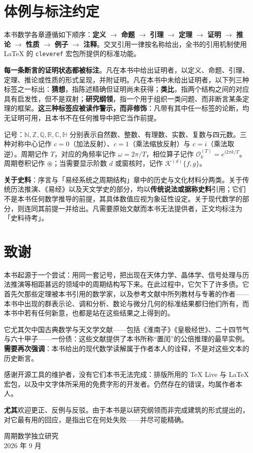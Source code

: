 \section*{体例与标注约定}

本书数学各章遵循如下顺序：\textbf{定义} $\to$ \textbf{命题} $\to$ \textbf{引理} $\to$ \textbf{定理} $\to$ \textbf{证明} $\to$ \textbf{推论} $\to$ \textbf{性质} $\to$ \textbf{例子} $\to$ \textbf{注释}。交叉引用一律按名称给出，全书的引用机制使用 \LaTeX{} 的 \texttt{cleveref} 宏包所提供的标准功能。

\textbf{每一条断言的证明状态都被标注}。凡在本书中给出证明者，以定义、命题、引理、定理、推论或性质的形式呈现，并附证明。凡在本书中未给出证明者，以下列三种标签之一标出：\textbf{猜想}，指陈述精确但证明尚未获得；\textbf{类比}，指两个结构之间的对应具有启发性，但不是双射；\textbf{研究纲领}，指一个用于组织一类问题、而非断言某条定理的框架。\textbf{这三种标签应被读作警示，而非修饰}：凡带有其中任一标签的论断，均无证明可用，且本书不在任何推导中把它当作前提。

记号：$\mathbb{N}, \mathbb{Z}, \mathbb{Q}, \mathbb{R}, \mathbb{C}, \mathbb{H}$ 分别表示自然数、整数、有理数、实数、复数与四元数。三种对称中心记作 $c=0$（加法反射）、$c=1$（乘法缩放反射）与 $c=i$（乘法取逆）。周期记作 $T$，对应的角频率记作 $\omega = 2\pi/T$，相位算子记作 $\mathcal{O}_k^{(T)} = e^{i2\pi k/T}$。周期卷积记作 $\circledast$；当需要显示阶数 $d$ 或窗核时，记作 $\mathcal{K}^{(d)}\{f,g\}$。

\textbf{关于史料}：序言与「易经系统之周期结构」章中的历史与文化材料分两类。关于传统历法推演、《易经》以及天文学史的部分，均以\textbf{传统说法或据称史料}引用；它们不是本书任何数学推导的前提，其具体数值应视为象征性设定。关于现代数学的部分，则连同其前提一并给出。凡需要原始文献而本书无法提供者，正文均标注为「史料待考」。

\section*{致谢}

本书起源于一个尝试：用同一套记号，把出现在天体力学、晶体学、信号处理与历法推演等相距甚远的领域中的周期结构写下来。在此过程中，它欠下了许多债。它首先欠那些定理被本书引用的数学家，以及参考文献中所列教材与专著的作者——本书中出现的群表示论、调和分析、数论与微分几何的标准结果都归他们所有，而本书中若有任何新意，也都是站在这些结果之上得到的。

它尤其欠中国古典数学与天文学文献——包括《淮南子》《皇极经世》、二十四节气与六十甲子——一份债：这些文献提供了本书所称“置闰”的公倍推理的最早实例。\textbf{需要再次强调}：本书给出的现代数学读解属于作者本人的诠释，不是对这些文本的历史断言。

感谢开源工具的维护者，没有它们本书无法完成：排版所用的 \TeX{} Live 与 \LaTeX{} 宏包，以及中文字体所采用的免费字形的开发者。仍然存在的错误，均属作者本人。

\textbf{尤其}欢迎更正、反例与反驳。由于本书是以研究纲领而非完成建筑的形式提出的，对它最有用的回应，是指出它在何处失败——并尽可能精确。

\vspace{1em}
\begin{flushright}
周期数学独立研究\\
2026 年 9 月
\end{flushright}

